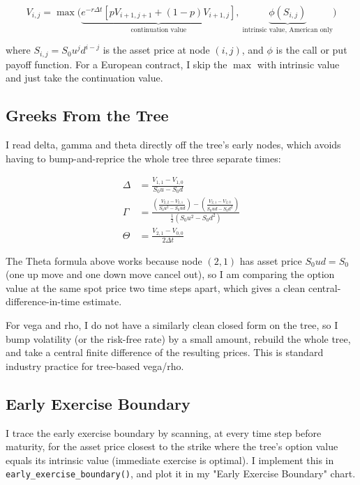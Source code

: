 \documentclass[12pt,a4paper]{article}
\begin{document}
\begin{equation}
V_{i,j} = \max\Big(\underbrace{e^{-r\Delta t}\left[p V_{i+1,j+1} + (1-p)V_{i+1,j}\right]}_{\text{continuation value}},\ \underbrace{\phi(S_{i,j})}_{\text{intrinsic value, American only}}\Big)
\end{equation}

where $S_{i,j} = S_0 u^j d^{i-j}$ is the asset price at node $(i,j)$, and
$\phi$ is the call or put payoff function. For a European contract, I skip
the $\max$ with intrinsic value and just take the continuation value.

\subsection{Greeks From the Tree}

I read delta, gamma and theta directly off the tree's early nodes, which
avoids having to bump-and-reprice the whole tree three separate times:

\begin{align}
\Delta &= \frac{V_{1,1} - V_{1,0}}{S_0 u - S_0 d} \\
\Gamma &= \frac{\left(\frac{V_{2,2}-V_{2,1}}{S_0u^2 - S_0ud}\right) - \left(\frac{V_{2,1}-V_{2,0}}{S_0ud - S_0d^2}\right)}{\frac{1}{2}(S_0u^2 - S_0d^2)} \\
\Theta &= \frac{V_{2,1} - V_{0,0}}{2\Delta t}
\end{align}

The Theta formula above works because node $(2,1)$ has asset price
$S_0 u d = S_0$ (one up move and one down move cancel out), so I am
comparing the option value at the same spot price two time steps apart,
which gives a clean central-difference-in-time estimate.

For vega and rho, I do not have a similarly clean closed form on the tree,
so I bump volatility (or the risk-free rate) by a small amount, rebuild the
whole tree, and take a central finite difference of the resulting prices.
This is standard industry practice for tree-based vega/rho.

\subsection{Early Exercise Boundary}

I trace the early exercise boundary by scanning, at every time step before
maturity, for the asset price closest to the strike where the tree's option
value equals its intrinsic value (immediate exercise is optimal). I
implement this in \texttt{early\_exercise\_boundary()}, and plot it in my
"Early Exercise Boundary" chart.
\end{document}
